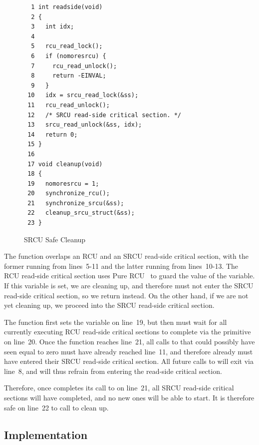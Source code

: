 \begin{figure}[htbp]
{ \scriptsize
\begin{verbatim}
  1 int readside(void)
  2 {
  3   int idx;
  4
  5   rcu_read_lock();
  6   if (nomoresrcu) {
  7     rcu_read_unlock();
  8     return -EINVAL;
  9   }
 10   idx = srcu_read_lock(&ss);
 11   rcu_read_unlock();
 12   /* SRCU read-side critical section. */
 13   srcu_read_unlock(&ss, idx);
 14   return 0;
 15 }
 16
 17 void cleanup(void)
 18 {
 19   nomoresrcu = 1;
 20   synchronize_rcu();
 21   synchronize_srcu(&ss);
 22   cleanup_srcu_struct(&ss);
 23 }
\end{verbatim}
}
\caption{SRCU Safe Cleanup}
\label{fig:app:rcuimpl:SRCU Safe Cleanup}
\end{figure}

The  function overlaps an RCU and an SRCU read-side
critical section, with the former running from lines~5-11 and the
latter running from lines~10-13.
The RCU read-side critical section uses Pure
%
%
RCU~\cite{PaulEdwardMcKenneyPhD}
%
to guard the
value of the  variable.
If this variable is set, we are cleaning up, and therefore must not enter
the SRCU read-side critical section, so we return  instead.
On the other hand, if we are not yet cleaning up, we proceed into the
SRCU read-side critical section.

The  function first sets the  variable
on line~19, but then must wait for all currently executing RCU read-side
critical sections to complete via the  primitive
on line~20.
Once the  function reaches line~21, all calls to
 that could possibly have seen  equal
to zero must have already reached line~11, and therefore already must
have entered their SRCU read-side critical section.
All future calls to  will exit via line~8, and will thus
refrain from entering the read-side critical section.

Therefore, once  completes its call to
 on line~21, all SRCU read-side critical sections
will have completed, and no new ones will be able to start.
It is therefore safe on line~22 to call 
to clean up.

\subsection{Implementation}
\label{sec:app:rcuimpl:Implementation}

